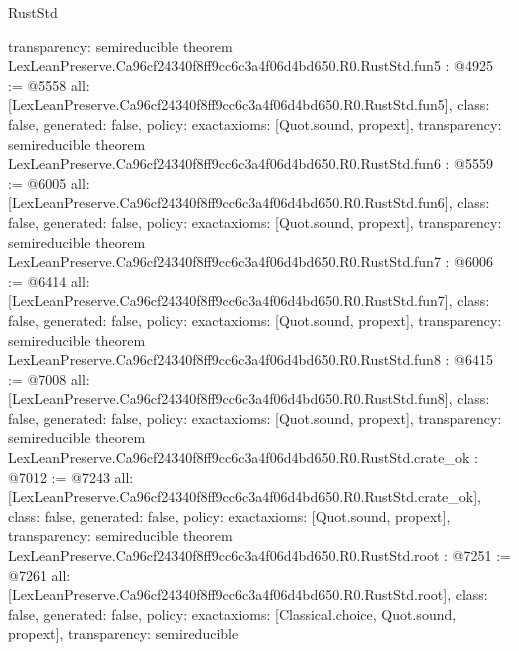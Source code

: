 \begin{lexlean}{RustStd}
\begin{coremodule}
{  transparency: semireducible
}
theorem LexLeanPreserve.Ca96cf24340f8ff9cc6c3a4f06d4bd650.R0.RustStd.fun5 : @4925 := @5558 {
  all: [LexLeanPreserve.Ca96cf24340f8ff9cc6c3a4f06d4bd650.R0.RustStd.fun5],
  class: false,
  generated: false,
  policy: exact{axioms: [Quot.sound, propext]},
  transparency: semireducible
}
theorem LexLeanPreserve.Ca96cf24340f8ff9cc6c3a4f06d4bd650.R0.RustStd.fun6 : @5559 := @6005 {
  all: [LexLeanPreserve.Ca96cf24340f8ff9cc6c3a4f06d4bd650.R0.RustStd.fun6],
  class: false,
  generated: false,
  policy: exact{axioms: [Quot.sound, propext]},
  transparency: semireducible
}
theorem LexLeanPreserve.Ca96cf24340f8ff9cc6c3a4f06d4bd650.R0.RustStd.fun7 : @6006 := @6414 {
  all: [LexLeanPreserve.Ca96cf24340f8ff9cc6c3a4f06d4bd650.R0.RustStd.fun7],
  class: false,
  generated: false,
  policy: exact{axioms: [Quot.sound, propext]},
  transparency: semireducible
}
theorem LexLeanPreserve.Ca96cf24340f8ff9cc6c3a4f06d4bd650.R0.RustStd.fun8 : @6415 := @7008 {
  all: [LexLeanPreserve.Ca96cf24340f8ff9cc6c3a4f06d4bd650.R0.RustStd.fun8],
  class: false,
  generated: false,
  policy: exact{axioms: [Quot.sound, propext]},
  transparency: semireducible
}
theorem LexLeanPreserve.Ca96cf24340f8ff9cc6c3a4f06d4bd650.R0.RustStd.crate_ok : @7012 := @7243 {
  all: [LexLeanPreserve.Ca96cf24340f8ff9cc6c3a4f06d4bd650.R0.RustStd.crate_ok],
  class: false,
  generated: false,
  policy: exact{axioms: [Quot.sound, propext]},
  transparency: semireducible
}
theorem LexLeanPreserve.Ca96cf24340f8ff9cc6c3a4f06d4bd650.R0.RustStd.root : @7251 := @7261 {
  all: [LexLeanPreserve.Ca96cf24340f8ff9cc6c3a4f06d4bd650.R0.RustStd.root],
  class: false,
  generated: false,
  policy: exact{axioms: [Classical.choice, Quot.sound, propext]},
  transparency: semireducible
}


\end{coremodule}
\end{lexlean}

